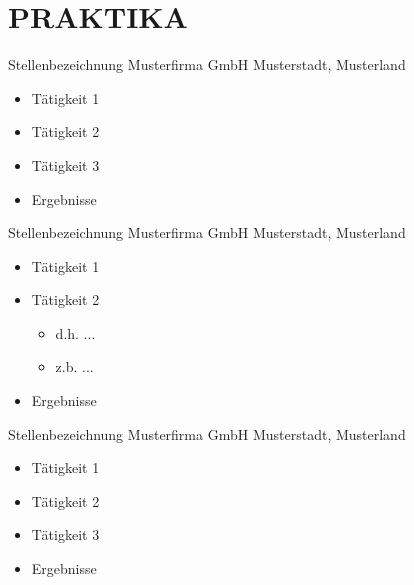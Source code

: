 \section{PRAKTIKA}

        {Stellenbezeichnung}
        {Musterfirma GmbH}
        {Musterstadt, Musterland}
        {}   %
        {
        \begin{itemize}
            \item Tätigkeit 1
            \item Tätigkeit 2
            \item Tätigkeit 3
            \item Ergebnisse
        \end{itemize}
        }
                
        {Stellenbezeichnung}
        {Musterfirma GmbH}
        {Musterstadt, Musterland}
        {}   %
        {
        \begin{itemize}
            \item Tätigkeit 1
            \item Tätigkeit 2
            \begin{itemize}
                \item d.h. ...
                \item z.b. ...
            \end{itemize}
            \item Ergebnisse
        \end{itemize}
        }


        {Stellenbezeichnung}
        {Musterfirma GmbH}
        {Musterstadt, Musterland}
        {}   %
        {
        \begin{itemize}
            \item Tätigkeit 1
            \item Tätigkeit 2
            \item Tätigkeit 3
            \item Ergebnisse
        \end{itemize}
        }

